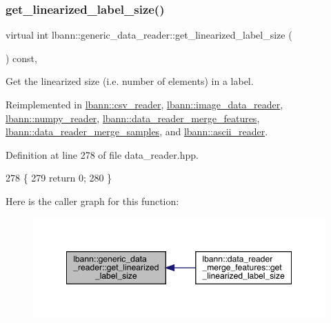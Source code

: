 \subsubsection{\texorpdfstring{get\+\_\+linearized\+\_\+label\+\_\+size()}{get\_linearized\_label\_size()}}
{\footnotesize\ttfamily virtual int lbann\+::generic\+\_\+data\+\_\+reader\+::get\+\_\+linearized\+\_\+label\+\_\+size (\begin{DoxyParamCaption}{ }\end{DoxyParamCaption}) const\hspace{0.3cm}{\ttfamily [inline]}, {\ttfamily [virtual]}}



Get the linearized size (i.\+e. number of elements) in a label. 



Reimplemented in \hyperlink{classlbann_1_1csv__reader_a2cff8a7ea0fbafebbab71a7731387447}{lbann\+::csv\+\_\+reader}, \hyperlink{classlbann_1_1image__data__reader_adb62b193a10b2b12c1bf183ea9c2095e}{lbann\+::image\+\_\+data\+\_\+reader}, \hyperlink{classlbann_1_1numpy__reader_aea3fe4402409e2bce9b5892c30779a20}{lbann\+::numpy\+\_\+reader}, \hyperlink{classlbann_1_1data__reader__merge__features_aa50959f29f761916a3cef60f33740516}{lbann\+::data\+\_\+reader\+\_\+merge\+\_\+features}, \hyperlink{classlbann_1_1data__reader__merge__samples_a880da359d18f4ae06ec50adf3b71219f}{lbann\+::data\+\_\+reader\+\_\+merge\+\_\+samples}, and \hyperlink{classlbann_1_1ascii__reader_aa997a38db111d3a8a9a0e08169ac9cc3}{lbann\+::ascii\+\_\+reader}.



Definition at line 278 of file data\+\_\+reader.\+hpp.


\begin{DoxyCode}
278                                                 \{
279     \textcolor{keywordflow}{return} 0;
280   \}
\end{DoxyCode}
Here is the caller graph for this function\+:\nopagebreak
\begin{figure}[H]
\begin{center}
\leavevmode
\includegraphics[width=349pt]{classlbann_1_1generic__data__reader_a99e8ba4f09fdc86d238ad7c8d2e2bce0_icgraph}
\end{center}
\end{figure}
\mbox{\label{classlbann_1_1generic__data__reader_aacd8704cd11ed6f521cebeaac06c6cb7}} 
